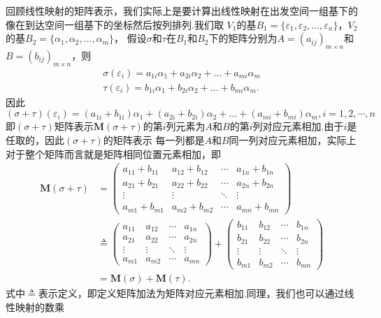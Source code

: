 回顾线性映射的矩阵表示，我们实际上是要计算出线性映射在出发空间一组基下的像在到达空间一组基下的坐标然后按列排列.我们取
$V_1$的基$B_1=\{\varepsilon_1,\varepsilon_2,\ldots,\varepsilon_n\}$，$V_2$的基$B_2=\{\alpha_1,\alpha_2,\ldots,\alpha_m\}$，
假设$\sigma$和$\tau$在$B_1$和$B_2$下的矩阵分别为$A=(a_{ij})_{m\times n}$和$B=(b_{ij})_{m\times n}$，则
\begin{gather*}
    \sigma(\varepsilon_i)=a_{1i}\alpha_1+a_{2i}\alpha_2+\ldots+a_{mi}\alpha_m \\
    \tau(\varepsilon_i)=b_{1i}\alpha_1+b_{2i}\alpha_2+\ldots+b_{mi}\alpha_m.
\end{gather*}
因此
\[(\sigma+\tau)(\varepsilon_i)=(a_{1i}+b_{1i})\alpha_1+(a_{2i}+b_{2i})\alpha_2+\ldots+(a_{mi}+b_{mi})\alpha_m,i=1,2,\cdots,n\]
即$(\sigma+\tau)$矩阵表示$\mathbf{M}(\sigma+\tau)$的第$i$列元素为$A$和$B$的第$i$列对应元素相加.由于$i$是任取的，因此$(\sigma+\tau)$的矩阵表示
每一列都是$A$和$B$同一列对应元素相加，实际上对于整个矩阵而言就是矩阵相同位置元素相加，即
\begin{align*}
    \mathbf{M}(\sigma+\tau)&=\begin{pmatrix}
        a_{11}+b_{11} & a_{12}+b_{12} & \cdots & a_{1n}+b_{1n} \\
        a_{21}+b_{21} & a_{22}+b_{22} & \cdots & a_{2n}+b_{2n} \\
        \vdots & \vdots & \ddots & \vdots \\
        a_{m1}+b_{m1} & a_{m2}+b_{m2} & \cdots & a_{mn}+b_{mn}
    \end{pmatrix} \\
    &\triangleq\begin{pmatrix}
        a_{11} & a_{12} & \cdots & a_{1n} \\
        a_{21} & a_{22} & \cdots & a_{2n} \\
        \vdots & \vdots & \ddots & \vdots \\
        a_{m1} & a_{m2} & \cdots & a_{mn}
    \end{pmatrix}+\begin{pmatrix}
        b_{11} & b_{12} & \cdots & b_{1n} \\
        b_{21} & b_{22} & \cdots & b_{2n} \\
        \vdots & \vdots & \ddots & \vdots \\
        b_{m1} & b_{m2} & \cdots & b_{mn}
    \end{pmatrix} \\
    &=\mathbf{M}(\sigma)+\mathbf{M}(\tau).
\end{align*}
式中$\triangleq$表示定义，即定义矩阵加法为矩阵对应元素相加.同理，我们也可以通过线性映射的数乘
